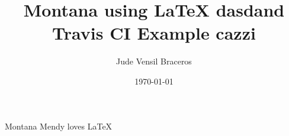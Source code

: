 \documentclass{article}
\title{Montana using LaTeX dasdand Travis CI Example cazzi}
\author{Jude Vensil Braceros}
\date{\today}
\begin{document}
\maketitle

Montana Mendy loves LaTeX 
\end{document}
